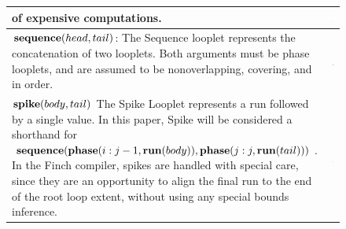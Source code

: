 \begin{figure}[ht]
\begin{tabular} {|l|c|}
\begin{minipage}[c]{0.65\linewidth}
        of expensive computations.
    \end{minipage} &
    \begin{minipage}[c]{0.25\linewidth}
        \centering
        \includegraphics[scale=0.20]{Looplets-thunk.png}
    \end{minipage} \\ \hline
    \begin{minipage}[c]{0.65\linewidth}
        $\text{\textbf{sequence}}(head, tail)$: The Sequence looplet represents the
        concatenation of two looplets. Both arguments must be phase looplets, and
        are assumed to be nonoverlapping, covering, and in order.
    \end{minipage} &
    \begin{minipage}[c]{0.25\linewidth}
        \centering
        \includegraphics[scale=0.20]{Looplets-sequence.png}
    \end{minipage} \\ \hline
    \begin{minipage}[c]{0.65\linewidth}
        $\text{\textbf{spike}}(body, tail)$ The Spike Looplet represents a run
        followed by a single value. In this paper, Spike will be considered a
        shorthand for $\text{\textbf{sequence}}(\text{\textbf{phase}}(i:j-1, \text{\textbf{run}}(body)),
        \text{\textbf{phase}}(j:j, \text{\textbf{run}}(tail)))$.  In the Finch compiler, spikes are
        handled with special care, since they are an opportunity to align the
        final run to the end of the root loop extent, without using any special
        bounds inference.
    \end{minipage} &
    \begin{minipage}[c]{0.25\linewidth}
        \centering
        \includegraphics[scale=0.20]{Looplets-spike.png}

\end{minipage}
\end{tabular}
\end{figure}

